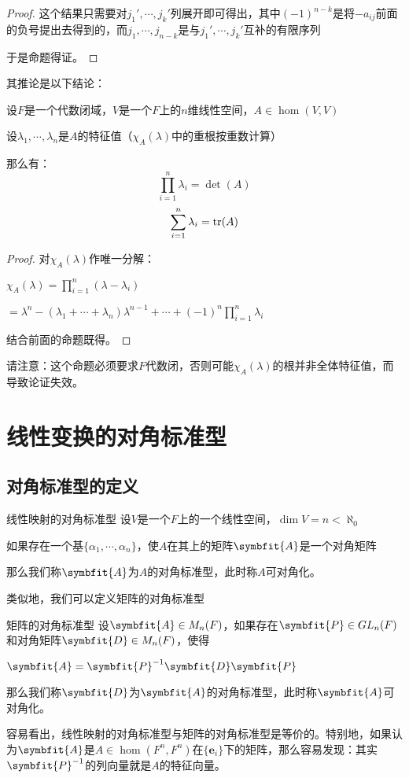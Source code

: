 \documentclass[12pt, a4paper, oneside, UTF8]{ctexbook}
\begin{document}
\begin{para}{0}
\begin{proof}
						这个结果只需要对$j_1',\cdots,j_k'$列展开即可得出，其中$(-1)^{n-k}$是将$-a_{ij}$前面的负号提出去得到的，而$j_1,\cdots,j_{n-k}$是与$j_1',\cdots,j_k'$互补的有限序列

						于是命题得证。
					\end{proof}
					其推论是以下结论：
					\begin{corollary}{}{}
						设$F$是一个代数闭域，$V$是一个$F$上的$n$维线性空间，$A \in \hom(V,V)$

						设$\lambda_1,\cdots,\lambda_n$是$A$的特征值（$\chi_A(\lambda )$中的重根按重数计算）

						那么有：
						\begin{equation}
							\prod\limits_{i=1}^{n} \lambda_i = \det(A)
						\end{equation}
						\begin{equation}
							\sum\limits_{i=1}^{n} \lambda_i = \operatorname{tr}(A)
						\end{equation}
					\end{corollary}
					\begin{proof}
						对$\chi_A(\lambda )$作唯一分解：

						$\chi_A(\lambda )=\prod\limits_{i=1}^{n}(\lambda -\lambda_i)$

						$=\lambda^n - (\lambda_1+\cdots+\lambda_n)\lambda^{n-1}+\cdots+(-1)^n \prod_{i=1}^{n}\lambda_i$

						结合前面的命题既得。
					\end{proof}
					请注意：这个命题必须要求$F$代数闭，否则可能$\chi_A(\lambda )$的根并非全体特征值，而导致论证失效。
			\end{para}
	\section{线性变换的对角标准型}
		\subsection{对角标准型的定义}
			\begin{defn}{线性映射的对角标准型}{}
				设$V$是一个$F$上的一个线性空间，$\dim V = n < \aleph_0$

				如果存在一个基$\{\alpha_1,\cdots,\alpha_n\}$，使$A$在其上的矩阵$\symbfit{A}$是一个对角矩阵

				那么我们称$\symbfit{A}$为$A$的对角标准型，此时称$A$可对角化。
			\end{defn}
			类似地，我们可以定义矩阵的对角标准型
			\begin{defn}{矩阵的对角标准型}{}
				设$\symbfit{A} \in M_n(F)$，如果存在$\symbfit{P}\in GL_n(F)$和对角矩阵$\symbfit{D}\in M_n(F)$，使得

				$\symbfit{A}=\symbfit{P}^{-1}\symbfit{D}\symbfit{P}$

				那么我们称$\symbfit{D}$为$\symbfit{A}$的对角标准型，此时称$\symbfit{A}$可对角化。
			\end{defn}
			容易看出，线性映射的对角标准型与矩阵的对角标准型是等价的。特别地，如果认为$\symbfit{A}$是$A \in \hom(F^n,F^n)$在$\{\mathbf{e}_i\}$下的矩阵，那么容易发现：其实$\symbfit{P}^{-1}$的列向量就是$A$的特征向量。
\end{document}

